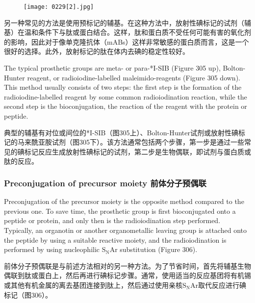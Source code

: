 \documentclass[dvipsnames, svgnames,a4paper,11pt]{article}
\begin{document}
\begin{figure}[h]
	\centering
    \texttt{[image: 0229[2].jpg]}  
     \label{fig305}
\end{figure}

另一种常见的方法是使用预标记的辅基。在这种方法中，放射性碘标记的试剂（辅基）在温和条件下与肽或蛋白结合。这样，肽和蛋白质不受任何可能有害的氧化剂的影响，因此对于像单克隆抗体（mABs）这样非常敏感的蛋白质而言，这是一个很好的选择。此外，放射标记的肽在体内去碘的稳定性较好。  

The typical prosthetic groups are meta- or para-*I-SIB (Figure 305 up), Bolton-Hunter reagent, or radioiodine-labelled maleimido-reagents (Figure 305 down). This method usually consists of two steps: the first step is the formation of the radioiodine-labelled reagent by some common radioiodination reaction, while the second step is the bioconjugation, the reaction of the reagent with the protein or peptide.  



典型的辅基有对位或间位的*I-SIB（图305上）、Bolton-Hunter试剂或放射性碘标记的马来酰亚胺试剂（图305下）。该方法通常包括两个步骤，第一步是通过一些常见的碘标记反应生成放射性碘标记的试剂，第二步是生物偶联，即试剂与蛋白质或肽的反应。  

\subsubsection{Preconjugation of precursor moiety 前体分子预偶联}  
Preconjugation of the precursor moiety is the opposite method compared to the previous one. To save time, the prosthetic group is first bioconjugated onto a peptide or protein, and only then is the radioiodination step performed. Typically, an organotin or another organometallic leaving group is attached onto the peptide by using a suitable reactive moiety, and the radioiodination is performed by using nucleophilic $\mathrm{S_NAr}$ substitution (Figure 306).  

前体分子预偶联是与前述方法相对的另一种方法。为了节省时间，首先将辅基生物偶联到肽或蛋白上，然后再进行碘标记步骤。通常，使用适当的反应基团将有机锡或其他有机金属的离去基团连接到肽上，然后通过使用亲核$\mathrm{S_NAr}$取代反应进行碘标记（图306）。  
\end{document}
